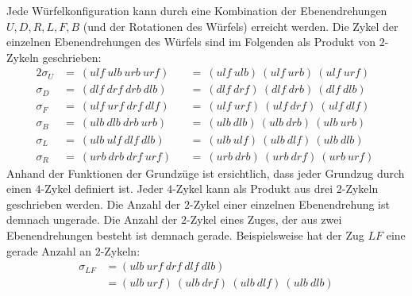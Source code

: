\documentclass[12pt,a4paper, usenames, dvipsnames]{article}
\theoremstyle{mystyle}
\theoremstyle{definition}
\begin{document}
Jede Würfelkonfiguration kann durch eine Kombination der Ebenendrehungen $U, D, R, L, F, B$ (und der Rotationen des Würfels) erreicht werden. 
Die Zykel der einzelnen Ebenendrehungen des Würfels sind im Folgenden als Produkt von $2$-Zykeln geschrieben:
\begin{alignat*}{2}
\sigma_U &  = \ ( \textit{ulf} \ \textit{ulb} \ \textit{urb} \ \textit{urf} ) &&  = \ ( \textit{ulf} \ \textit{ulb} )   \ 
( \textit{ulf} \ \textit{urb} )  \ 
( \textit{ulf} \  \textit{urf} )\\

\sigma_D & = \ ( \textit{dlf} \ \textit{drf} \ \textit{drb} \ \textit{dlb} )  && = \ ( \textit{dlf} \ \textit{drf} )  \ 
( \textit{dlf} \ \textit{drb}  )  \ 
( \textit{dlf} \ \textit{dlb} )\\

\sigma_F & = \ ( \textit{ulf} \ \textit{urf} \ \textit{drf} \ \textit{dlf} )  && = \ ( \textit{ulf} \ \textit{urf} ) \ 
( \textit{ulf} \ \textit{drf} ) \ 
( \textit{ulf}  \ \textit{dlf} ) \\

\sigma_B & = \ ( \textit{ulb} \ \textit{dlb} \ \textit{drb} \ \textit{urb} )  && = \ ( \textit{ulb} \ \textit{dlb} ) \ 
( \textit{ulb} \  \textit{drb} ) \ 
( \textit{ulb}  \ \textit{urb} )\\

\sigma_L & = \ ( \textit{ulb} \ \textit{ulf} \ \textit{dlf} \ \textit{dlb} )  && = \ ( \textit{ulb} \ \textit{ulf} )  \ 
( \textit{ulb} \ \textit{dlf}  )  \ 
( \textit{ulb} \ \textit{dlb} ) \\

\sigma_R & = \ ( \textit{urb} \ \textit{drb} \ \textit{drf} \ \textit{urf} ) && = \  ( \textit{urb} \ \textit{drb}  )  \ 
( \textit{urb} \  \textit{drf} )  \ 
( \textit{urb} \ \textit{urf} )  \
\end{alignat*}
Anhand der Funktionen der Grundzüge ist ersichtlich, dass jeder Grundzug durch einen $4$-Zykel definiert ist.
Jeder $4$-Zykel kann als Produkt aus drei $2$-Zykeln geschrieben werden. 
Die Anzahl der $2$-Zykel einer einzelnen Ebenendrehung ist demnach ungerade. Die Anzahl der $2$-Zykel eines Zuges, der aus zwei Ebenendrehungen besteht ist demnach gerade.
Beispielsweise hat der Zug $LF$ eine gerade Anzahl an $2$-Zykeln:
\begin{align*}
\sigma_{LF} & = (\textit{ulb} \ \textit{urf} \ \textit{drf} \ \textit{dlf} \ \textit{dlb}) \\
 & =  (\textit{ulb} \ \textit{urf}) \ (\textit{ulb} \ \textit{drf}) \ (\textit{ulb} \ \textit{dlf}) \ (\textit{ulb} \ \textit{dlb})
\end{align*}
\end{document}

